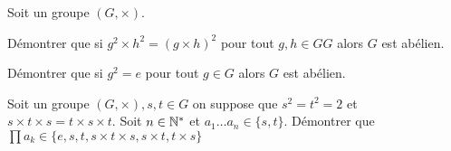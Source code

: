\documentclass{report}
\begin{document}
\begin{exo}
    Soit un groupe \(\left(G,\times\right)\).
    \begin{q}{1}
        Démontrer que si \(g^2\times h^2=(g\times h)^2\) pour tout \(g,h\in G G\)
        alors \(G\) est abélien.
    \end{q}
    \begin{q}{2}
        Démontrer que si \(g^2=e\) pour tout \(g\in G\) alors \(G\) est abélien.
    \end{q}
\end{exo}

\begin{exo}
    Soit un groupe \(\left(G,\times\right), s,t\in G\) on suppose que \(s^2=t^2=2\)
    et \(s\times t\times s = t\times s \times t\). Soit \(n\in\mathbb{N}^*\) et
    \(a_1\dots a_n\in\{s,t\}\). Démontrer que \(\prod a_k \in
    \{e,s,t,s\times t\times s, s\times t, t\times s\}\)
\end{exo}
\end{document}
